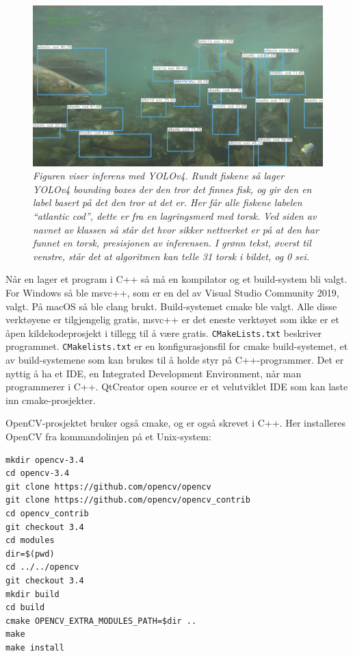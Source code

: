 \begin{figure}
\begin{center} 
\includegraphics[scale=0.35]{figures/inference_yolo}
\caption{\small \sl Figuren viser inferens med YOLOv4. Rundt fiskene så lager YOLOv4 bounding boxes der den tror det finnes fisk, og gir den en label basert på det den tror at det er. Her får alle fiskene labelen ``atlantic cod'', dette er fra en lagringsmerd med torsk. Ved siden av navnet av klassen så står det hvor sikker nettverket er på at den har funnet en torsk, presisjonen av inferensen. I grønn tekst, øverst til venstre, står det at algoritmen kan telle 31 torsk i bildet, og 0 sei. \label{fig:yolo_inference}} 
\end{center} 
\end{figure} 

Når en lager et program i C++ så må en kompilator og et build-system bli valgt. For Windows så ble msvc++, som er en del av Visual Studio Community 2019, valgt. På macOS så ble clang brukt. Build-systemet cmake ble valgt. Alle disse verktøyene er tilgjengelig gratis, msvc++ er det eneste verktøyet som ikke er et åpen kildekodeprosjekt i tillegg til å være gratis. \texttt{CMakeLists.txt} beskriver programmet. \texttt{CMakelists.txt} er en konfigurasjonsfil for cmake build-systemet, et av build-systemene som kan brukes til å holde styr på C++-programmer. Det er nyttig å ha et IDE, en Integrated Development Environment, når man programmerer i C++. QtCreator open source er et velutviklet IDE som kan laste inn cmake-prosjekter.

OpenCV-prosjektet bruker også cmake, og er også skrevet i C++. Her installeres OpenCV fra kommandolinjen på et Unix-system:

\begin{verbatim}
mkdir opencv-3.4
cd opencv-3.4
git clone https://github.com/opencv/opencv
git clone https://github.com/opencv/opencv_contrib
cd opencv_contrib
git checkout 3.4
cd modules
dir=$(pwd)
cd ../../opencv
git checkout 3.4
mkdir build
cd build
cmake OPENCV_EXTRA_MODULES_PATH=$dir ..
make
make install
\end{verbatim}

